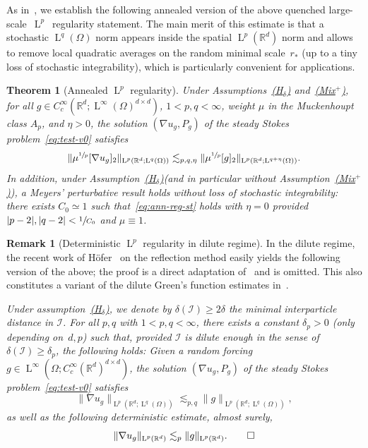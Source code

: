 \documentclass[JEP,XML,SOM,Unicode,published]{cedram}
\let\mathcal\mathscr
\newcounter{assumption}
\newcommand{\Hd}{\hyperref[Hd]{\textup{(H$_\delta$)}}\xspace}
\newcommand{\Mix}{\hyperref[Mix+]{\textup{(Mix$^+$)}}\xspace}
\theoremstyle{plain}
\newtheorem{theor1}{Theorem}
\theoremstyle{definition}
\newtheorem{rem}[theor]{Remark}
\newcommand{\R}{\mathbb R}
\newcommand{\Ic}{\mathcal I}
\newcommand{\Ld}{\operatorname{L}}
\begin{document}
As in~\cite{DG-20}, we establish the following annealed version of the above quenched large-scale~$\Ld^p$~regularity statement.
The main merit of this estimate is that a stochastic $\Ld^q(\Omega)$ norm appears inside the spatial $\Ld^p(\R^d)$ norm and allows to remove local quadratic averages on the random minimal scale~$r_*$ (up to a tiny loss of stochastic integrability), which is particularly convenient for applications.

\begin{theor1}[Annealed $\Ld^p$ regularity]\label{th:ann-reg}
Under Assumptions~\Hd and~\Mix, for all $g\in C^\infty_c(\R^d;\Ld^\infty(\Omega)^{d\times d})$, $1<p,q<\infty$, weight $\mu$ in the Muckenhoupt class $A_p$, and $\eta>0$, the solution $(\nabla u_g,P_g)$ of the steady Stokes problem~\eqref{eq:test-v0} satisfies
\begin{equation}\label{eq:ann-reg-st}
\|\mu^{\sfrac1p}[\nabla u_g]_2\|_{\Ld^p(\R^d;\Ld^q(\Omega))}\lesssim_{p,q,\eta}\|\mu^{\sfrac1p}[g]_2\|_{\Ld^p(\R^d;\Ld^{q+\eta}(\Omega))}.
\end{equation}
In addition, under Assumption~\Hd (and in particular without Assumption~\Mix), a Meyers' perturbative result holds without loss of stochastic integrability: there exists $C_0\simeq1$ such that~\eqref{eq:ann-reg-st} holds with $\eta=0$ provided $|p-2|,|q-2|<\sfrac1{C_0}$ and $\mu\equiv1$.
\end{theor1}

\begin{rem}[Deterministic $\Ld^p$ regularity in dilute regime]\label{rem:reg-hofer}
In the dilute regime, the recent work of Höfer~\cite{Hofer-19} on the reflection method
easily yields the following version of the above; the proof is a direct adaptation of~\cite{Hofer-19} and is omitted.
This also constitutes a variant of the dilute Green's function estimates in~\cite[Lem.\,2.7]{Gloria-19}.

{\it Under assumption~\Hd, we denote by $\delta(\Ic)\ge2\delta$ the minimal interparticle distance in $\Ic$.
For all $p,q$ with $1<p,q<\infty$, there exists a constant $\delta_{p}>0$ (only depending on~$d,p$) such that, provided $\Ic$ is dilute enough in the sense of $\delta(\Ic)\ge\delta_{p}$, the following holds: Given a random forcing $g\in\Ld^\infty(\Omega;C^\infty_c(\R^d)^{d\times d})$, the solution $(\nabla u_g,P_g)$ of the steady Stokes problem~\eqref{eq:test-v0} satisfies
\[\|\nabla u_g\|_{\Ld^p(\R^d;\Ld^q(\Omega))}\lesssim_{p,q}\|g\|_{\Ld^p(\R^d;\Ld^q(\Omega))},\]
as well as the following deterministic estimate, almost surely,
\[\|\nabla u_g\|_{\Ld^p(\R^d)}\lesssim_{p}\|g\|_{\Ld^p(\R^d)}.\qedhere\]
}
\end{rem}
\end{document}
